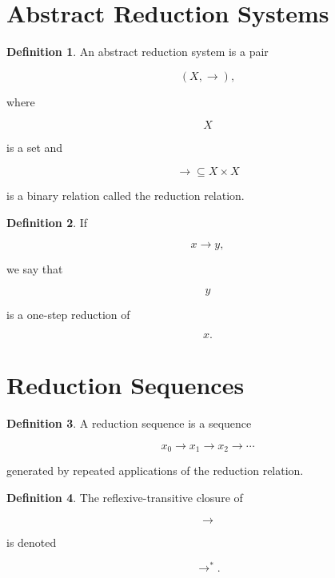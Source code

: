 \documentclass[11pt]{book}
\numberwithin{equation}{chapter}
\theoremstyle{definition}
\newtheorem{definition}{Definition}[chapter]
\theoremstyle{plain}
\begin{document}
\section{Abstract Reduction Systems}

\begin{definition}

An abstract reduction system is a pair

\[
(X,\rightarrow),
\]

where

\[
X
\]

is a set and

\[
\rightarrow
\subseteq
X\times X
\]

is a binary relation called the reduction relation.

\end{definition}


\begin{definition}

If

\[
x\rightarrow y,
\]

we say that

\[
y
\]

is a one-step reduction of

\[
x.
\]

\end{definition}


\section{Reduction Sequences}

\begin{definition}

A reduction sequence is a sequence

\[
x_0
\rightarrow
x_1
\rightarrow
x_2
\rightarrow
\cdots
\]

generated by repeated applications of the reduction relation.

\end{definition}


\begin{definition}

The reflexive-transitive closure of

\[
\rightarrow
\]

is denoted

\[
\rightarrow^{*}.
\]

\end{definition}
\end{document}
